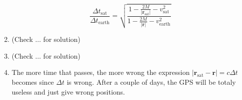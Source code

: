 \documentclass[a4paper,10pt,english]{article}
\begin{document}
\begin{enumerate}
\begin{equation*}
\frac{\Delta t_{\text{sat}}}{\Delta t_{\text{earth}}}=\sqrt{\frac{1-\frac{2M}{|\textbf{r}_{\text{sat}}|}-v_{\text{sat}}^{2}}{1-\frac{2M}{|\textbf{r}|}-v_{\text{earth}}^{2}}}
\end{equation*}

\item (Check $\ldots$ for solution)

\item (Check $\ldots$ for solution)

\item The more time that passes, the more wrong the expression $|\textbf{r}_{\text{sat}}-\textbf{r}|=c\Delta t$ becomes since $\Delta t$ is wrong. After a couple of days, the GPS will be totaly useless and just give wrong positions.

\end{enumerate}
\end{document}
